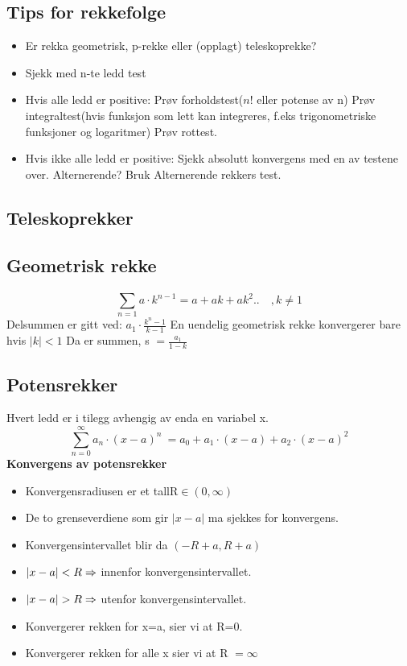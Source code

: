 \documentclass[12pt]{article}
\begin{document}
\subsection*{Tips for rekkefolge}
\begin{itemize}
\item Er rekka geometrisk, p-rekke eller
\newline (opplagt) teleskoprekke?
\item Sjekk med n-te ledd test
\item Hvis alle ledd er positive:
\newline Prøv forholdstest($n!$ eller potense av n)
\newline Prøv integraltest(hvis funksjon som lett kan integreres, f.eks trigonometriske funksjoner og logaritmer)
\newline Prøv rottest.
\item Hvis ikke alle ledd er positive:
\newline Sjekk absolutt konvergens med en av testene over.
\newline Alternerende? Bruk Alternerende rekkers test.
\end{itemize}
\subsection*{Teleskoprekker}
\subsection*{Geometrisk rekke}
\[\sum_{n=1}^{} a \cdot k^{n-1} = a + ak + ak^{2}..\quad,k \neq 1\]
\newline Delsummen er gitt ved: $a_1 \cdot \frac{k^n -1}{k-1}$
\newline En uendelig geometrisk rekke konvergerer bare hvis $|k|<1$
\newline Da er summen, s $= \frac{a_1}{1-k} \quad$
\subsection*{Potensrekker}
Hvert ledd er i tilegg avhengig av enda en variabel x.
\[\sum^{\infty}_{n=0} a_{n} \cdot (x-a)^{n}\ = a_0 + a_1 \cdot (x-a) + a_2 \cdot (x-a)^{2}\]
{\bf Konvergens av potensrekker}
\begin{itemize}
\item Konvergensradiusen er et tall\newline R$\in(0,\infty)$
\item De to grenseverdiene som gir $|x-a|$ ma sjekkes for konvergens.
\item Konvergensintervallet blir da \newline$(-R+a,R+a)$
\item $|x-a|<R\newline\Rightarrow$ innenfor konvergensintervallet.
\item $|x-a|>R\newline\Rightarrow$ utenfor konvergensintervallet.
\item Konvergerer rekken for x=a, sier vi at R=0.
\item Konvergerer rekken for alle x sier vi at R $=\infty$ 
\end{itemize}
\end{document}
